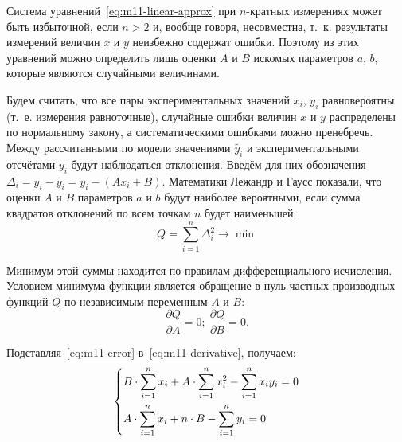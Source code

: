 \documentclass[a4paper, 12pt]{extarticle}
\newcommand{\isum}{\sum\limits_{i=1}^{n}}
\begin{document}
Система уравнений~\eqref{eq:m11-linear-approx} при $n$-кратных измерениях может быть избыточной, если $n >2$ и, вообще говоря, несовместна, т.~к. результаты измерений величин $x$ и $y$ неизбежно содержат ошибки. Поэтому из этих уравнений можно определить лишь оценки $A$ и $B$ искомых параметров $a$, $b$, которые являются случайными величинами. %

Будем считать, что все пары экспериментальных значений $x_i$, $y_i$  равновероятны (т.~е. измерения равноточные), случайные ошибки величин $x$ и $y$ распределены по нормальному закону, а систематическими ошибками можно пренебречь. Между рассчитанными по модели значениями $\widetilde{y_i}$ и экспериментальными отсчётами $y_i$ будут наблюдаться отклонения. Введём для них обозначения $\Delta_i = y_i - \widetilde{y_i} = y_i - (A  x_i + B)$. %
Математики Лежандр и Гаусс показали, что оценки $A$ и $B$ параметров $a$ и $b$  будут наиболее вероятными, если сумма квадратов отклонений по всем точкам $n$ будет наименьшей: %
\begin{equation}
\label{eq:m11-error}
Q = \isum \Delta_i^2 \to \min
\end{equation}

Минимум этой суммы находится по правилам дифференциального исчисления. Условием минимума функции является обращение в нуль частных производных функций $Q$ по независимым переменным $A$ и $B$:  %
\begin{equation}
\label{eq:m11-derivative}
\frac{\partial Q}{\partial A} = 0; \ \frac{\partial Q}{\partial B} = 0. %
\end{equation}

Подставляя~\eqref{eq:m11-error} в~\eqref{eq:m11-derivative}, получаем: %
\begin{equation}
\label{eq:m11-system}
\left\{ \aligned
&B \cdot \isum x_i + A \cdot \isum x_i^2 - \isum x_i y_i = 0 \\ %
&A \cdot \isum x_i + n \cdot B - \isum y_i = 0  %
\endaligned \right.
\end{equation}
\end{document}
